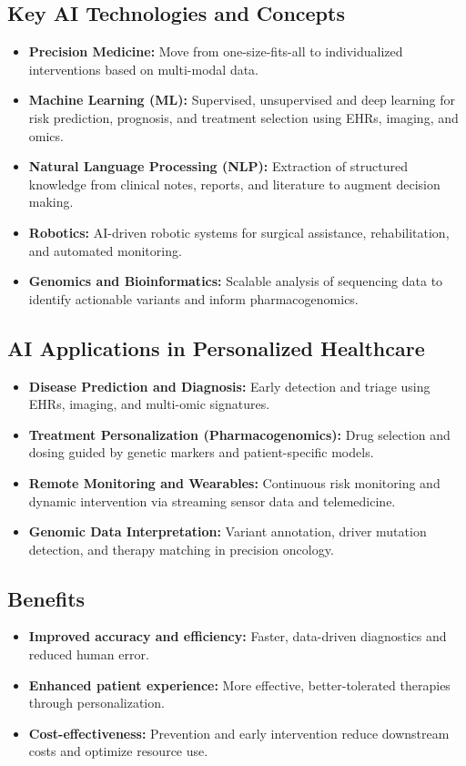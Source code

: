 \subsection*{Key AI Technologies and Concepts}
\begin{itemize}
    \item \textbf{Precision Medicine:} Move from one-size-fits-all to individualized interventions based on multi-modal data.
    \item \textbf{Machine Learning (ML):} Supervised, unsupervised and deep learning for risk prediction, prognosis, and treatment selection using EHRs, imaging, and omics.
    \item \textbf{Natural Language Processing (NLP):} Extraction of structured knowledge from clinical notes, reports, and literature to augment decision making.
    \item \textbf{Robotics:} AI-driven robotic systems for surgical assistance, rehabilitation, and automated monitoring.
    \item \textbf{Genomics and Bioinformatics:} Scalable analysis of sequencing data to identify actionable variants and inform pharmacogenomics.
\end{itemize}

\subsection*{AI Applications in Personalized Healthcare}
\begin{itemize}
    \item \textbf{Disease Prediction and Diagnosis:} Early detection and triage using EHRs, imaging, and multi-omic signatures.
    \item \textbf{Treatment Personalization (Pharmacogenomics):} Drug selection and dosing guided by genetic markers and patient-specific models.
    \item \textbf{Remote Monitoring and Wearables:} Continuous risk monitoring and dynamic intervention via streaming sensor data and telemedicine.
    \item \textbf{Genomic Data Interpretation:} Variant annotation, driver mutation detection, and therapy matching in precision oncology.
\end{itemize}

\subsection*{Benefits}
\begin{itemize}
    \item \textbf{Improved accuracy and efficiency:} Faster, data-driven diagnostics and reduced human error.
    \item \textbf{Enhanced patient experience:} More effective, better-tolerated therapies through personalization.
    \item \textbf{Cost-effectiveness:} Prevention and early intervention reduce downstream costs and optimize resource use.
\end{itemize}

